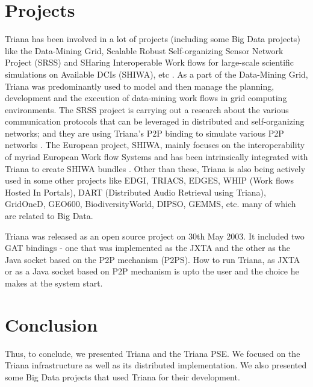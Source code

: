 \documentclass[9pt,twocolumn,twoside]{styles/osajnl}
\begin{document}
\section{Projects}

Triana has been involved in a lot of projects (including some Big Data projects) 
like the Data-Mining Grid, 
Scalable Robust Self-organizing Sensor Network Project (SRSS) and 
SHaring Interoperable Work flows for large-scale
scientific simulations on Available DCIs (SHIWA), etc \cite{Triana-projects} 
\cite{Triana-Data-Mining-Grid} \cite{Triana-SRSS} \cite{Triana-SHIWA} .  As a part of
the Data-Mining Grid, Triana was predominantly used to model and then
manage the planning, development and the execution of data-mining work
flows in grid computing environments.  The SRSS
project is carrying out a research about the various communication
protocols that can be leveraged in distributed and self-organizing
networks; and they are using Triana's P2P binding to simulate various
P2P networks \cite{Triana-SRSS}.  The European project, SHIWA, mainly focuses on the
interoperability of myriad European Work flow Systems and has been
intrinsically integrated with Triana to create SHIWA bundles \cite{Triana-SHIWA}.  
Other than these, Triana is also being actively used
in some other projects like EDGI, TRIACS, EDGES, WHIP (Work flows
Hosted In Portals), DART (Distributed Audio Retrieval using Triana),
GridOneD, GEO600, BiodiversityWorld, DIPSO, GEMMS, etc. many of which
are related to Big Data.

Triana was released as an open source project on 30th May 2003. It 
included two GAT bindings - one that was implemented as the JXTA and the 
other as the Java socket based on the P2P mechanism (P2PS). How to run 
Triana, as JXTA or as a Java socket based on P2P mechanism is upto the 
user and the choice he makes at the system start.

\section{Conclusion}

Thus, to conclude, we presented Triana and the Triana PSE.  We focused
on the Triana infrastructure as well as its distributed
implementation.  We also presented some Big Data projects that used
Triana for their development.



\end{document}

